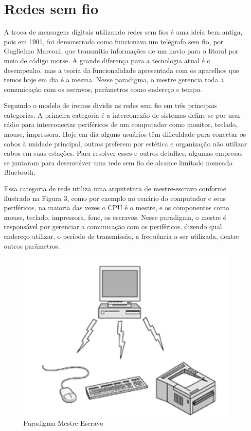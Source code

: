 \documentclass[12pt, %
openright, 
oneside,
a4paper,
brazil]{facom-ufu-abntex2}
\begin{document}
\section{Redes sem fio}
A troca de mensagens digitais utilizando redes sem fios é uma ideia bem antiga, pois em 1901, foi demonstrado como funcionava um telégrafo sem fio, por Guglielmo Marconi, que transmitia informações de um navio para o litoral por meio de código morse. A grande diferença para a tecnologia atual é o desempenho, mas a teoria da funcionalidade apresentada com os aparelhos que temos hoje em dia é a mesma. Nesse paradigma, o mestre gerencia toda a comunicação com os escravos, parâmetros como endereço e tempo.

Seguindo o modelo de \cite{tanenbaum2003redes} iremos dividir as redes sem fio em três principais categorias. A primeira categoria é a interconexão de sistemas define-se por usar rádio para interconectar periféricos de um computador como monitor, teclado, mouse, impressora. Hoje em dia alguns usuários têm dificuldade para conectar os cabos à unidade principal, outros preferem por estética e organização não utilizar cabos em suas estações. Para resolver esses e outros detalhes, algumas empresas se juntaram para desenvolver uma rede sem fio de alcance limitado nomeada Bluetooth.

Essa categoria de rede utiliza uma arquitetura de mestre-escravo conforme ilustrado na Figura 3, como por exemplo no cenário do computador e seus periféricos, na maioria das vezes o CPU é o mestre, e os componentes como mouse, teclado, impressora, fone, os escravos. Nesse paradigma, o mestre é responsável por gerenciar a comunicação com os periféricos, dizendo qual endereço utilizar, o período de transmissão, a frequência a ser utilizada, dentre outros parâmetros.

\begin{figure}[hbt]
  \includegraphics[scale=0.9]{bt}
  \caption{Paradigma Mestre-Escravo \cite{tanenbaum2003redes}}
\end{figure}
\end{document}
